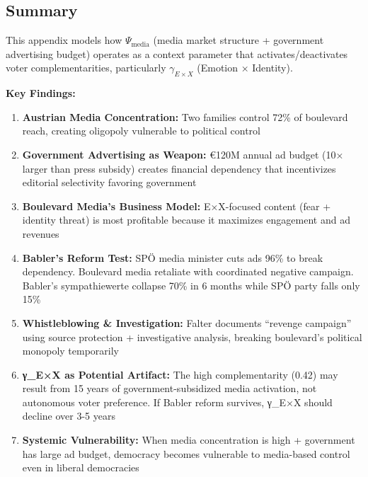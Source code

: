\label{sec:dx-summary}

\subsection{Summary}

This appendix models how $\Psi_{\text{media}}$ (media market structure + government
advertising budget) operates as a context parameter that activates/deactivates
voter complementarities, particularly $\gamma_{E \times X}$ (Emotion × Identity).

\textbf{Key Findings:}

\begin{enumerate}
\item \textbf{Austrian Media Concentration:} Two families control 72\% of boulevard
  reach, creating oligopoly vulnerable to political control

\item \textbf{Government Advertising as Weapon:} €120M annual ad budget (10× larger
  than press subsidy) creates financial dependency that incentivizes editorial
  selectivity favoring government

\item \textbf{Boulevard Media's Business Model:} E×X-focused content (fear + identity
  threat) is most profitable because it maximizes engagement and ad revenues

\item \textbf{Babler's Reform Test:} SPÖ media minister cuts ads 96\% to break
  dependency. Boulevard media retaliate with coordinated negative campaign.
  Babler's sympathiewerte collapse 70\% in 6 months while SPÖ party falls only 15\%

\item \textbf{Whistleblowing & Investigation:} Falter documents ``revenge campaign''
  using source protection + investigative analysis, breaking boulevard's political
  monopoly temporarily

\item \textbf{γ_{E×X} as Potential Artifact:} The high complementarity (0.42) may
  result from 15 years of government-subsidized media activation, not autonomous
  voter preference. If Babler reform survives, γ_{E×X} should decline over 3-5 years

\item \textbf{Systemic Vulnerability:} When media concentration is high + government
  has large ad budget, democracy becomes vulnerable to media-based control even in
  liberal democracies
\end{enumerate}

